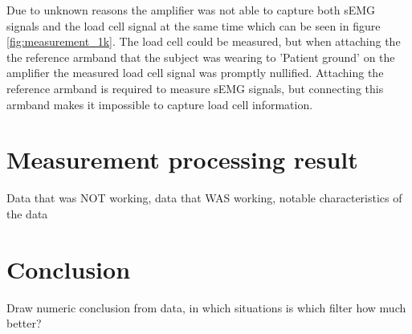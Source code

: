 Due to unknown reasons the amplifier was not able to capture both sEMG signals and the load cell signal at the same time which can be seen in figure \ref{fig:measurement_1k}. The load cell could be measured, but when attaching the the reference armband that the subject was wearing to 'Patient ground' on the amplifier the measured load cell signal was promptly nullified. Attaching the reference armband is required to measure sEMG signals, but connecting this armband makes it impossible to capture load cell information.

\section{Measurement processing result}

Data that was NOT working, data that WAS working, notable characteristics of the data


\section{Conclusion}
Draw numeric conclusion from data, in which situations is which filter how much better?
